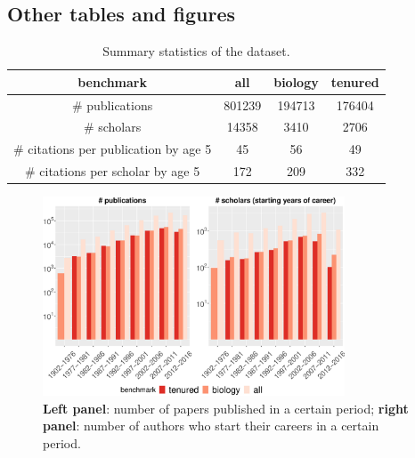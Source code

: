 \begin{refsection}
\section{Other tables and figures}
\begin{table}[ht]
\centering
\begin{tabular}{c|c|c|c}
 benchmark     & all   & biology & tenured \\
\midrule
\# publications & 801239 & 194713 & 176404 \\
\# scholars & 14358 & 3410  & 2706 \\
\# citations per publication by age 5  & 45    & 56    & 49 \\
\# citations per scholar by age 5 & 172   & 209   & 332 \\
\end{tabular}%
\caption[Summary statistics of the dataset]{Summary statistics of the dataset. }
\label{tab:exploratory}
\end{table}

\begin{figure}[ht!]
    \centering
    \includegraphics[width=0.8\textwidth]{figures/exploratory/npub_naut.eps}
    \caption[Exploratory statistics of the dataset]{\textbf{Left panel}: number of papers published in a certain period; \textbf{right panel}: number of authors who start their careers in a certain period. }
    \label{fig:exploratory}
\end{figure}


\end{refsection}
